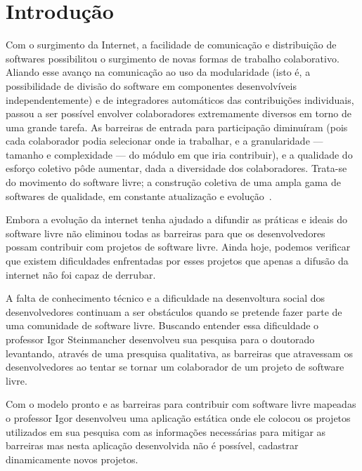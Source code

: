 \chapter{Introdução}

Com o surgimento da Internet, a facilidade de comunicação e distribuição de 
softwares possibilitou o surgimento de novas formas de trabalho colaborativo.
Aliando esse avanço na comunicação ao uso da modularidade (isto é, a possibilidade 
de divisão do software em componentes desenvolvíveis independentemente) e de 
integradores automáticos das contribuições individuais, passou a ser possível 
envolver colaboradores extremamente diversos em torno de uma grande tarefa. 
As barreiras de entrada para participação diminuíram (pois cada colaborador podia 
selecionar onde ia trabalhar, e a granularidade — tamanho e complexidade — do módulo 
em que iria contribuir), e a qualidade do esforço coletivo pôde aumentar, dada a 
diversidade dos colaboradores. Trata-se do movimento do software livre; 
a construção coletiva de uma ampla gama de softwares de qualidade, em constante 
atualização e evolução~\cite{simon2010rossio}.

Embora a evolução da internet tenha ajudado a difundir as práticas e ideais do
software livre não eliminou todas as barreiras para que os desenvolvedores possam
contribuir com projetos de software livre. Ainda hoje, podemos verificar que 
existem dificuldades enfrentadas por esses projetos que apenas a difusão da internet 
não foi capaz de derrubar.

A falta de conhecimento técnico e a dificuldade na desenvoltura social dos desenvolvedores
continuam a ser obstáculos quando se pretende fazer parte de uma comunidade de software
livre. Buscando entender essa dificuldade o professor Igor Steinmancher desenvolveu
sua pesquisa para o doutorado levantando, através de uma presquisa qualitativa,
as barreiras que atravessam os desenvolvedores ao tentar se tornar um colaborador 
de um projeto de software livre.

Com o modelo pronto e as barreiras para contribuir com software livre mapeadas o
professor Igor desenvolveu uma aplicação estática onde ele colocou os projetos 
utilizados em sua pesquisa com as informações necessárias para mitigar as barreiras
mas nesta aplicação desenvolvida não é possível, cadastrar dinamicamente novos projetos.

